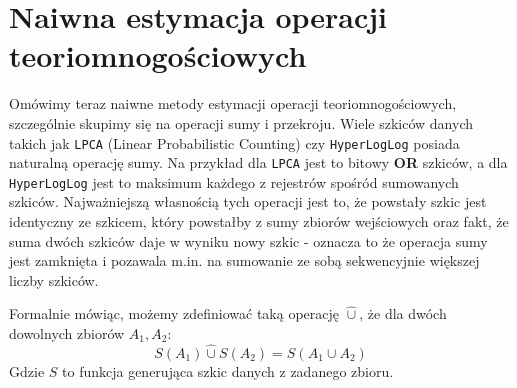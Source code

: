 \section{Naiwna estymacja operacji teoriomnogościowych}

Omówimy teraz naiwne metody estymacji operacji teoriomnogościowych, szczególnie skupimy się na operacji sumy i przekroju. Wiele szkiców danych takich jak \texttt{LPCA} (Linear Probabilistic Counting) czy \texttt{HyperLogLog} posiada naturalną operację sumy. Na przykład dla \texttt{LPCA} jest to bitowy \textbf{OR} szkiców, a dla \texttt{HyperLogLog} jest to maksimum każdego z rejestrów spośród sumowanych szkiców. Najważniejszą własnością tych operacji jest to, że powstały szkic jest identyczny ze szkicem, który powstałby z sumy zbiorów wejściowych oraz fakt, że suma dwóch szkiców daje w wyniku nowy szkic - oznacza to że operacja sumy jest zamknięta i pozawala m.in. na sumowanie ze sobą sekwencyjnie większej liczby szkiców.

Formalnie mówiąc, możemy zdefiniować taką operację $\hat{\cup}$, że dla dwóch dowolnych zbiorów $A_1, A_2$:
\begin{equation}
    S(A_1) \hat{\cup} S(A_2) = S(A_1 \cup A_2)
\end{equation}
Gdzie $S$ to funkcja generująca szkic danych z zadanego zbioru.

